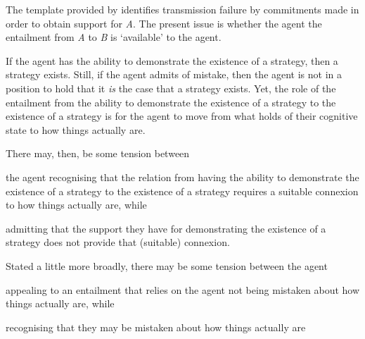 \documentclass[10pt]{article}
\begin{document}
\begin{note}
  The template provided by \citeauthor{Wright:2011wn} identifies transmission failure by commitments made in order to obtain support for \emph{A}.
  The present issue is whether the agent the entailment from \emph{A} to \emph{B} is `available' to the agent.

  If the agent has the ability to demonstrate the existence of a strategy, then a strategy exists.
  Still, if the agent admits of mistake, then the agent is not in a position to hold that it \emph{is} the case that a strategy exists.
  Yet, the role of the entailment from the ability to demonstrate the existence of a strategy to the existence of a strategy is for the agent to move from what holds of their cognitive state to how things actually are.

  There may, then, be some tension between
  \begin{enumerate*}
  \item the agent recognising that the relation from having the ability to demonstrate the existence of a strategy to the existence of a strategy requires a suitable connexion to how things actually are, while
  \item admitting that the support they have for demonstrating the existence of a strategy does not provide that (suitable) connexion.
  \end{enumerate*}
  Stated a little more broadly, there may be some tension between the agent
  \begin{enumerate*}
  \item appealing to an entailment that relies on the agent not being mistaken about how things actually are, while
  \item recognising that they may be mistaken about how things actually are
  \end{enumerate*}
\end{note}
\end{document}
